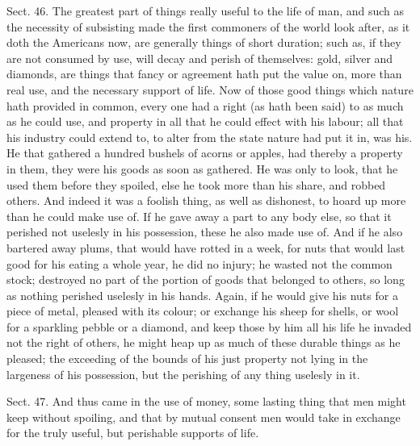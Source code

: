 \documentclass[11pt,openany]{book}
\begin{document}
Sect. 46. The greatest part of things really useful to the life of man, and such as the necessity of subsisting made the first commoners of the world look after, as it doth the Americans now, are generally things of short duration; such as, if they are not consumed by use, will decay and perish of themselves: gold, silver and diamonds, are things that fancy or agreement hath put the value on, more than real use, and the necessary support of life. Now of those good things which nature hath provided in common, every one had a right (as hath been said) to as much as he could use, and property in all that he could effect with his labour; all that his industry could extend to, to alter from the state nature had put it in, was his. He that gathered a hundred bushels of acorns or apples, had thereby a property in them, they were his goods as soon as gathered. He was only to look, that he used them before they spoiled, else he took more than his share, and robbed others. And indeed it was a foolish thing, as well as dishonest, to hoard up more than he could make use of. If he gave away a part to any body else, so that it perished not uselesly in his possession, these he also made use of. And if he also bartered away plums, that would have rotted in a week, for nuts that would last good for his eating a whole year, he did no injury; he wasted not the common stock; destroyed no part of the portion of goods that belonged to others, so long as nothing perished uselesly in his hands. Again, if he would give his nuts for a piece of metal, pleased with its colour; or exchange his sheep for shells, or wool for a sparkling pebble or a diamond, and keep those by him all his life he invaded not the right of others, he might heap up as much of these durable things as he pleased; the exceeding of the bounds of his just property not lying in the largeness of his possession, but the perishing of any thing uselesly in it.

Sect. 47. And thus came in the use of money, some lasting thing that men might keep without spoiling, and that by mutual consent men would take in exchange for the truly useful, but perishable supports of life.
\end{document}
